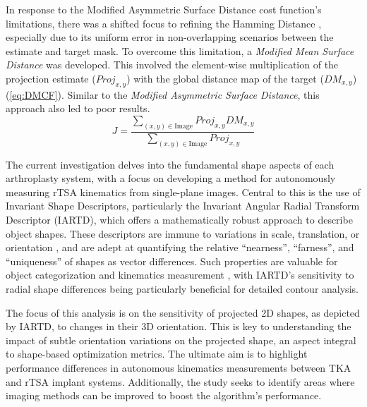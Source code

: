 In response to the Modified Asymmetric Surface Distance cost function's limitations, there was a shifted focus to refining the Hamming Distance \cite{floodAutomatedRegistration3D2018,jensenJointTrackMachine2023}, especially due to its uniform error in non-overlapping scenarios between the estimate and target mask.
To overcome this limitation, a \emph{Modified Mean Surface Distance} was developed.
This involved the element-wise multiplication of the projection estimate ($Proj_{x,y}$) with the global distance map of the target ($DM_{x,y}$) (\cref{eq:DMCF}).
Similar to the \emph{Modified Asymmetric Surface Distance}, this approach also led to poor results.
\begin{equation}
	\label{eq:DMCF}
	J = \dfrac{ \sum_{(x,y) \in \text{Image}} Proj_{x,y}DM_{x,y} }{\sum_{(x,y)\in \text{Image}}Proj_{x,y}}
\end{equation}


The current investigation delves into the fundamental shape aspects of each arthroplasty system, with a focus on developing a method for autonomously measuring rTSA kinematics from single-plane images.
Central to this is the use of Invariant Shape Descriptors, particularly the Invariant Angular Radial Transform Descriptor (IARTD), which offers a mathematically robust approach to describe object shapes.
These descriptors are immune to variations in scale, translation, or orientation \cite{zhangReviewShapeRepresentation2004}, and are adept at quantifying the relative ``nearness'', ``farness'', and ``uniqueness'' of shapes as vector differences.
Such properties are valuable for object categorization \cite{richardIdentificationThreeDimensionalObjects1974,wallaceAnalysisThreedimensionalMovement1980,wallaceEfficientThreedimensionalAircraft1980} and kinematics measurement \cite{banksAccurateMeasurementThreedimensional1996}, with IARTD's sensitivity to radial shape differences \cite{leeNewShapeDescription2012} being particularly beneficial for detailed contour analysis.

The focus of this analysis is on the sensitivity of projected 2D shapes, as depicted by IARTD, to changes in their 3D orientation.
This is key to understanding the impact of subtle orientation variations on the projected shape, an aspect integral to shape-based optimization metrics.
The ultimate aim is to highlight performance differences in autonomous kinematics measurements between TKA and rTSA implant systems.
Additionally, the study seeks to identify areas where imaging methods can be improved to boost the algorithm's performance.
